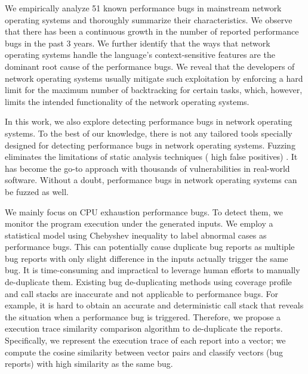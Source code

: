 We empirically analyze 51 known performance bugs in mainstream network operating systems and thoroughly summarize their characteristics.
%
We observe that there has been a continuous growth in the number of reported performance bugs in the past 3 years.
%
We further identify that the ways that network operating systems handle the language's context-sensitive features are the dominant root cause of the performance bugs.
%
We reveal that the developers of network operating systems usually mitigate such exploitation by enforcing a hard limit for the maximum number of backtracking for certain tasks, which, however, limits the intended functionality of the network operating systems.


In this work, we also explore detecting performance bugs in network operating systems.
%
To the best of our knowledge, there is not any tailored tools specially designed for detecting performance bugs in network operating systems.
%
Fuzzing \cite{slowfuzz, hotfuzz, perffuzz} eliminates the limitations of static analysis techniques 
(\eg{,} high false positives) 
\cite{perfbugstudy, nistor2013toddler,nistor2015caramel}.
%
It has become the go-to approach with thousands of vulnerabilities in real-world software.
%
Without a doubt, performance bugs in network operating systems can be fuzzed as well.
%
%
%
%
%
%

We mainly focus on CPU exhaustion performance bugs.
%
To detect them, we monitor the program execution under the generated inputs.
%
We employ a statistical model using Chebyshev inequality to label abnormal cases as performance bugs.
%
This can potentially cause duplicate bug reports as multiple bug reports with only slight difference in the inputs actually trigger the same bug.
%
It is time-consuming and impractical to leverage human efforts to manually de-duplicate them.
%
Existing bug de-duplicating methods using coverage profile and call stacks are inaccurate and not applicable to performance bugs.
%
For example, it is hard to obtain an accurate and deterministic call stack that reveals the situation when a performance bug is triggered.
%
Therefore, we propose a execution trace similarity comparison algorithm to de-duplicate the reports.
%
Specifically, we represent the execution trace of each report into a vector;
%
we compute the cosine similarity between vector pairs and classify vectors (bug reports) with high similarity as the same bug.
%

